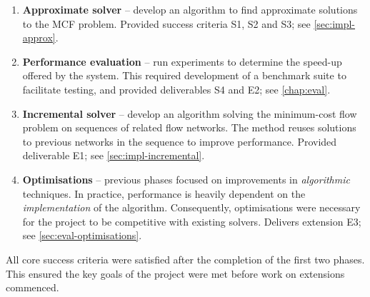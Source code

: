\begin{enumerate}
    \item \label{itm:phase-approximate}
        \textbf{Approximate solver} -- develop an algorithm to find approximate solutions to the MCF problem. Provided success criteria S1, S2 and S3; see \cref{sec:impl-approx}.
    \item \label{itm:phase-evaluation} 
        \textbf{Performance evaluation} -- run experiments to determine the speed-up offered by the system. This required development of a benchmark suite to facilitate testing, and provided deliverables S4 and E2; see \cref{chap:eval}.
    \item \label{itm:phase-incremental} 
        \textbf{Incremental solver} -- develop an algorithm solving the minimum-cost flow problem on sequences of related flow networks. The method reuses solutions to previous networks in the sequence to improve performance. Provided deliverable E1; see \cref{sec:impl-incremental}.
    \item \label{itm:phase-optimisations}
        \textbf{Optimisations} -- previous phases focused on improvements in \emph{algorithmic} techniques. In practice, performance is heavily dependent on the \emph{implementation} of the algorithm. Consequently, optimisations were necessary for the project to be competitive with existing solvers. Delivers extension E3; see \cref{sec:eval-optimisations}.
\end{enumerate}

All core success criteria were satisfied after the completion of the first two phases. This ensured the key goals of the project were met before work on extensions commenced. 

%

